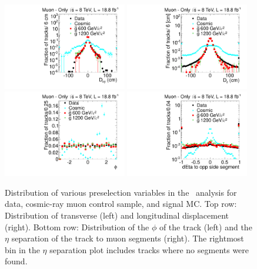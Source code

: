 \begin{figure}
\centering
  \includegraphics[clip=false, trim=0.0cm 0cm 0.0cm 0cm, width=0.48\textwidth]{figures/muonly/Selection_Comp_8TeV_Cosmic_Dxy_BS}
  \includegraphics[clip=false, trim=0.0cm 0cm 0.0cm 0cm, width=0.48\textwidth]{figures/muonly/Selection_Comp_8TeV_Cosmic_Dz_BS} \\
  \includegraphics[clip=false, trim=0.0cm 0cm 0.0cm 0cm, width=0.48\textwidth]{figures/muonly/Selection_Comp_8TeV_Cosmic_Phi_BS}
  \includegraphics[clip=false, trim=0.0cm 0cm 0.0cm 0cm, width=0.48\textwidth]{figures/muonly/Selection_Comp_8TeV_Cosmic_SegMinEtaSep_BS}
  \caption[Distribution of transverse and longitudinal displacement, $\phi$, and $\eta$ separation to muon segments
in the \muononly\ analysis for data, cosmic-ray muon control sample, and signal MC.]
{Distribution of various preselection variables in the \muononly\ analysis for data, cosmic-ray muon control sample, and signal MC.
Top row: Distribution of transverse (left) and longitudinal displacement (right).
Bottom row: Distribution of the $\phi$ of the track (left) and the $\eta$ separation of the track to muon segments (right). The rightmost bin in the
$\eta$ separation plot includes tracks where no segments were found.}
    \label{fig:MuOnlyPreselC}
\end{figure}

